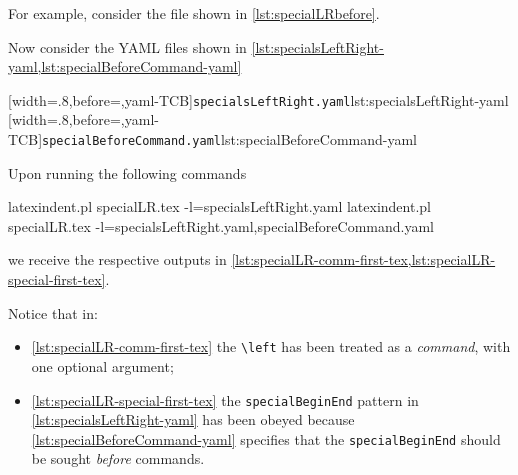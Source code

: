  \begin{example}
 For example, consider the file shown in \cref{lst:specialLRbefore}.%


 Now consider the YAML files shown in
 \cref{lst:specialsLeftRight-yaml,lst:specialBeforeCommand-yaml}

 \begin{cmhtcbraster}
  [width=.8\linewidth,before=\centering,yaml-TCB]{\texttt{specialsLeftRight.yaml}}{lst:specialsLeftRight-yaml}
  [width=.8\linewidth,before=\centering,yaml-TCB]{\texttt{specialBeforeCommand.yaml}}{lst:specialBeforeCommand-yaml}
 \end{cmhtcbraster}

 Upon running the following commands 
 \begin{widepage}

  \begin{commandshell}
latexindent.pl specialLR.tex -l=specialsLeftRight.yaml      
latexindent.pl specialLR.tex -l=specialsLeftRight.yaml,specialBeforeCommand.yaml      
\end{commandshell}

 \end{widepage}
 we receive the respective outputs in
 \cref{lst:specialLR-comm-first-tex,lst:specialLR-special-first-tex}.

 \begin{minipage}{.49\linewidth}
 \end{minipage}
 \hfill
 \begin{minipage}{.49\linewidth}
 \end{minipage}

 Notice that in:
 \begin{itemize}
  \item \cref{lst:specialLR-comm-first-tex} the \lstinline!\left! has been treated as a
        \emph{command}, with one optional argument;
  \item \cref{lst:specialLR-special-first-tex} the \texttt{specialBeginEnd} pattern in
        \cref{lst:specialsLeftRight-yaml}
        has been obeyed because \cref{lst:specialBeforeCommand-yaml} specifies that the
        \texttt{specialBeginEnd} should be sought \emph{before} commands.
 \end{itemize}
 \end{example}

